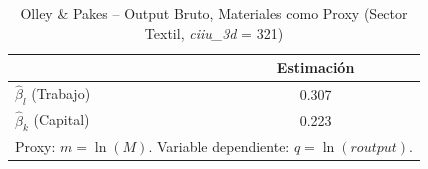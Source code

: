 \begin{table}[H]
\centering
\caption{Olley \& Pakes -- Output Bruto, Materiales como Proxy (Sector Textil, \textit{ciiu\_3d} = 321)}
\begin{tabular}{lc}
\toprule
 & Estimación \\
\midrule
$\hat{\beta}_l$ (Trabajo) & 0.307 \\
$\hat{\beta}_k$ (Capital) & 0.223 \\
\bottomrule
\multicolumn{2}{l}{\small Proxy: $m = \ln(M)$. Variable dependiente: $q = \ln(\mathit{routput})$.}
\end{tabular}
\end{table}
